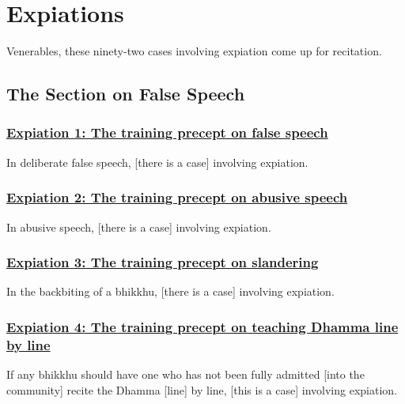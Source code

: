 
\section{Expiations}
\label{exp}

\begin{center}
	Venerables, these ninety-two cases involving expiation come up for recitation.
\end{center}

\setsubsecheadstyle{\subsectionFmt}
\subsection{The Section on False Speech}

\subsubsection*{\hyperref[pac1]{Expiation 1: The training precept on false speech}}
\label{exp1}

In deliberate false speech, [there is a case] involving expiation.



\subsubsection*{\hyperref[pac2]{Expiation 2: The training precept on abusive speech}}
\label{exp2}

In abusive speech, [there is a case] involving expiation.



\subsubsection*{\hyperref[pac3]{Expiation 3: The training precept on slandering}}
\label{exp3}

In the backbiting of a bhikkhu, [there is a case] involving expiation.



\subsubsection*{\hyperref[pac4]{Expiation 4: The training precept on teaching Dhamma line by line}}
\label{exp4}

If any bhikkhu should have one who has not been fully admitted [into the community] recite the Dhamma [line] by line, [this is a case] involving expiation.



